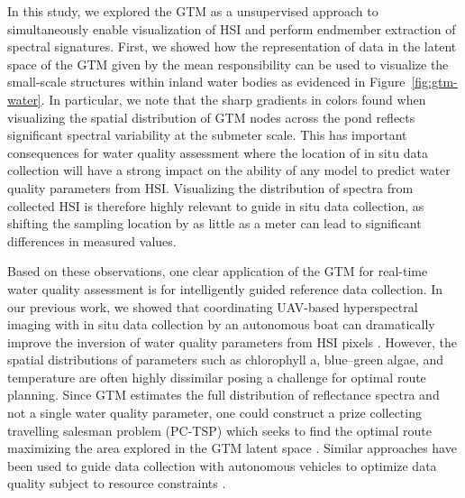 In this study, we explored the GTM as a unsupervised approach to simultaneously
enable visualization of HSI and perform endmember extraction of spectral
signatures. First, we showed how the representation of data in the latent space
of the GTM given by the mean responsibility can be used to visualize the
small-scale structures within inland water bodies as evidenced in
Figure~\ref{fig:gtm-water}. In particular, we note that the sharp gradients in
colors found when visualizing the spatial distribution of GTM nodes across the
pond reflects significant spectral variability at the submeter scale.
This has important consequences for water quality assessment where the location
of in situ data collection will have a strong impact on the ability of any model
to predict water quality parameters from HSI. Visualizing the distribution of
spectra from collected HSI is therefore highly relevant to guide in situ data
collection, as shifting the sampling location by as little as a meter can lead
to significant differences in measured values.

Based on these observations, one clear application of the GTM for real-time
water quality assessment is for intelligently guided reference data collection.
In our previous work, we showed that coordinating UAV-based hyperspectral
imaging with in situ data collection by an autonomous boat can dramatically
improve the inversion of water quality parameters from HSI pixels
\cite{robot-team-2}. However, the spatial distributions of parameters such as
chlorophyll a, blue--green algae, and temperature are often highly dissimilar
posing a challenge for optimal route planning. Since  GTM estimates the full
distribution of reflectance spectra and not a single water quality parameter,
one could construct a prize collecting travelling salesman problem (PC-TSP)
which seeks to find the optimal route maximizing the area explored in the GTM
latent space \cite{balas2007prize}. Similar approaches have been used to guide
data collection with autonomous vehicles to optimize data quality subject to
resource constraints \cite{suryan2020learning}.

